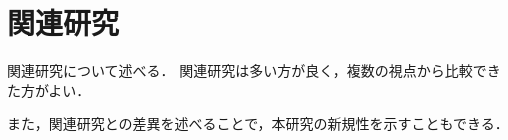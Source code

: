 \chapter{関連研究}
\label{research}

関連研究について述べる．
関連研究は多い方が良く，複数の視点から比較できた方がよい．

また，関連研究との差異を述べることで，本研究の新規性を示すこともできる．








